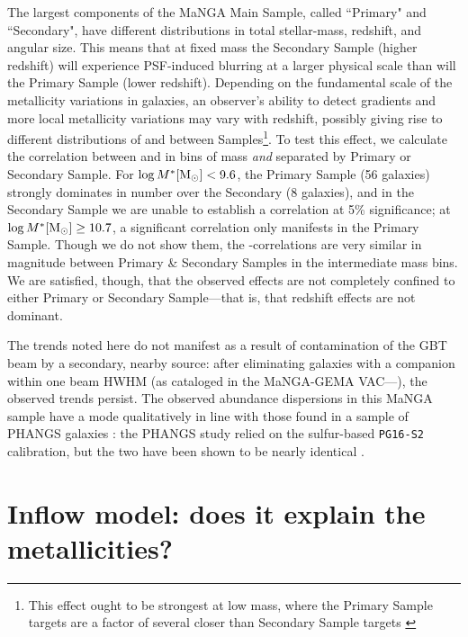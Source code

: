 The largest components of the MaNGA Main Sample, called ``Primary" and ``Secondary", have different distributions in total stellar-mass, redshift, and angular size. This means that at fixed mass the Secondary Sample (higher redshift) will experience PSF-induced blurring at a larger physical scale than will the Primary Sample (lower redshift). Depending on the fundamental scale of the metallicity variations in galaxies, an observer's ability to detect gradients and more local metallicity variations may vary with redshift, possibly giving rise to different distributions of \metdec and \metdisp between Samples\footnote{This effect ought to be strongest at low mass, where the Primary Sample targets are a factor of several closer than Secondary Sample targets \citep{manga_sample_wake_17}}. To test this effect, we calculate the correlation between \metdec and \metdisp in bins of mass \emph{and} separated by Primary or Secondary Sample. For $\log M^* {\rm [M_{\odot}]} < 9.6$, the Primary Sample (56 galaxies) strongly dominates in number over the Secondary (8 galaxies), and in the Secondary Sample we are unable to establish a correlation at 5\% significance; at $\log M^* {\rm [M_{\odot}]} \ge 10.7$, a significant correlation only manifests in the Primary Sample. Though we do not show them, the \metdec-\metdisp correlations are very similar in magnitude between Primary \& Secondary Samples in the intermediate mass bins. We are satisfied, though, that the observed effects are not completely confined to either Primary or Secondary Sample---that is, that redshift effects are not dominant.

The trends noted here do not manifest as a result of contamination of the GBT beam by a secondary, nearby source: after eliminating galaxies with a companion within one beam HWHM (as cataloged in the MaNGA-GEMA VAC---\citealt{argudo-fernandez_2015_environment}), the observed trends persist. The observed abundance dispersions in this MaNGA sample have a mode qualitatively in line with those found in a sample of PHANGS galaxies \citep{kreckel_2019_phangs_metgrads}: the PHANGS study relied on the sulfur-based \texttt{PG16-S2} calibration, but the two have been shown to be nearly identical \citep{pilyugin_grebel_2016}.

\section{Inflow model: does it explain the metallicities?}
\label{sec:modeling}

